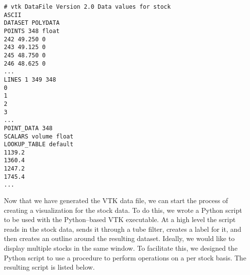 \begin{lstlisting}[numbers=none]
# vtk DataFile Version 2.0 Data values for stock
ASCII
DATASET POLYDATA
POINTS 348 float
242 49.250 0
243 49.125 0
245 48.750 0
246 48.625 0
...
LINES 1 349 348
0
1
2
3
...
POINT_DATA 348
SCALARS volume float
LOOKUP_TABLE default
1139.2
1360.4
1247.2
1745.4
...
\end{lstlisting}

\noindent Now that we have generated the VTK data file, we can start the process of creating a visualization for the stock data. To do this, we wrote a Python script to be used with the Python--based VTK executable. At a high level the script reads in the stock data, sends it through a tube filter, creates a label for it, and then creates an outline around the resulting dataset. Ideally, we would like to display multiple stocks in the same window. To facilitate this, we designed the Python script to use a procedure to perform operations on a per stock basis. The resulting script is listed below.


